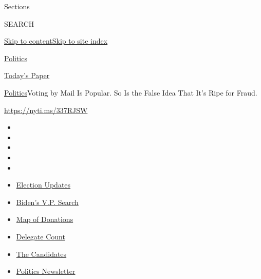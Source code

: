 Sections

SEARCH

\protect\hyperlink{site-content}{Skip to
content}\protect\hyperlink{site-index}{Skip to site index}

\href{https://www.nytimes.com/section/politics}{Politics}

\href{https://myaccount.nytimes.com/auth/login?response_type=cookie\&client_id=vi}{}

\href{https://www.nytimes.com/section/todayspaper}{Today's Paper}

\href{/section/politics}{Politics}\textbar{}Voting by Mail Is Popular.
So Is the False Idea That It's Ripe for Fraud.

\url{https://nyti.ms/337RJSW}

\begin{itemize}
\item
\item
\item
\item
\item
\end{itemize}

\begin{itemize}
\item
  \href{https://www.nytimes.com/2020/07/31/us/elections/biden-vs-trump.html?action=click\&pgtype=Article\&state=default\&region=TOP_BANNER\&context=storylines_menu}{Election
  Updates}
\item
  \href{https://www.nytimes.com/article/biden-vice-president-2020.html?action=click\&pgtype=Article\&state=default\&region=TOP_BANNER\&context=storylines_menu}{Biden's
  V.P. Search}
\item
  \href{https://www.nytimes.com/interactive/2020/07/24/us/politics/trump-biden-campaign-donors.html?action=click\&pgtype=Article\&state=default\&region=TOP_BANNER\&context=storylines_menu}{Map
  of Donations}
\item
  \href{https://www.nytimes.com/interactive/2020/us/elections/delegate-count-primary-results.html?action=click\&pgtype=Article\&state=default\&region=TOP_BANNER\&context=storylines_menu}{Delegate
  Count}
\item
  \href{https://www.nytimes.com/interactive/2019/us/politics/2020-presidential-candidates.html?action=click\&pgtype=Article\&state=default\&region=TOP_BANNER\&context=storylines_menu}{The
  Candidates}
\item
  \href{https://www.nytimes.com/newsletters/politics?action=click\&pgtype=Article\&state=default\&region=TOP_BANNER\&context=storylines_menu}{Politics
  Newsletter}
\end{itemize}

